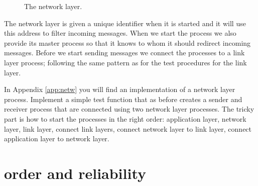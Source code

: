 \documentclass[a4paper,11pt]{article}
\begin{document}
\begin{figure}
\centering  
{}
\caption{The network layer.}
\label{fig:net}
\end{figure}

The network layer is given a unique identifier when it is started and
it will use this address to filter incoming messages. When we start
the process we also provide its master process so that it knows to whom
it should redirect incoming messages. Before we start sending messages
we connect the processes to a link layer process; following the
same pattern as for the test procedures for the link layer.


In Appendix \ref{app:netw} you will find an implementation of a
network layer process. Implement a simple test function that as before
creates a sender and receiver process that are connected using two
network layer processes. The tricky part is how to start the processes
in the right order: application layer, network layer, link layer,
connect link layers, connect network layer to link layer, connect
application layer to network layer.


\section{order and reliability}
\end{document}
